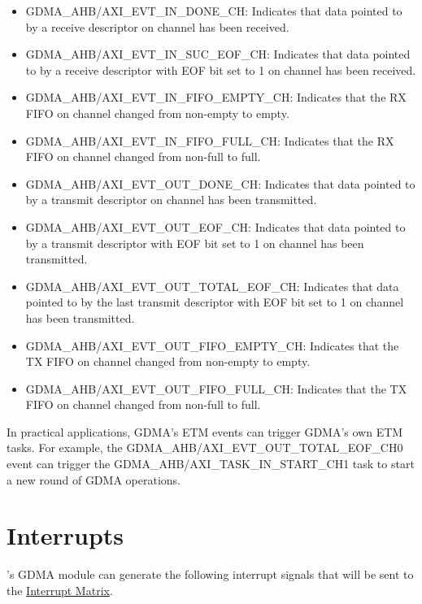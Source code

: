 \documentclass[main\_\_EN.tex]{subfiles}
\begin{document}
\begin{itemize}
    \item GDMA\_AHB/AXI\_EVT\_IN\_DONE\_CH: Indicates that data pointed to by a receive descriptor on channel  has been received.
    \item GDMA\_AHB/AXI\_EVT\_IN\_SUC\_EOF\_CH: Indicates that data pointed to by a receive descriptor with EOF bit set to 1 on channel  has been received.
    \item GDMA\_AHB/AXI\_EVT\_IN\_FIFO\_EMPTY\_CH: Indicates that the RX FIFO on channel  changed from non-empty to empty.
    \item GDMA\_AHB/AXI\_EVT\_IN\_FIFO\_FULL\_CH: Indicates that the RX FIFO on channel  changed from non-full to full.
    \item GDMA\_AHB/AXI\_EVT\_OUT\_DONE\_CH: Indicates that data pointed to by a transmit descriptor on channel  has been transmitted.
    \item GDMA\_AHB/AXI\_EVT\_OUT\_EOF\_CH: Indicates that data pointed to by a transmit descriptor with EOF bit set to 1 on channel  has been transmitted.
    \item GDMA\_AHB/AXI\_EVT\_OUT\_TOTAL\_EOF\_CH: Indicates that data pointed to by the last transmit descriptor with EOF bit set to 1 on channel  has been transmitted.
    \item GDMA\_AHB/AXI\_EVT\_OUT\_FIFO\_EMPTY\_CH: Indicates that the TX FIFO on channel  changed from non-empty to empty.
    \item GDMA\_AHB/AXI\_EVT\_OUT\_FIFO\_FULL\_CH: Indicates that the TX FIFO on channel  changed from non-full to full.
\end{itemize}

In practical applications, GDMA's ETM events can trigger GDMA's own ETM tasks. For example, the GDMA\_AHB/AXI\_EVT\_OUT\_TOTAL\_EOF\_CH0 event can trigger the GDMA\_AHB/AXI\_TASK\_IN\_START\_CH1 task to start a new round of GDMA operations.

\section{Interrupts}

\chipname{}'s GDMA module can generate the following interrupt signals that will be sent to the \hyperref[mod:intmtrx]{Interrupt Matrix}.
\end{document}
